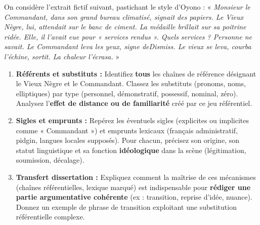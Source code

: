 \documentclass[11pt]{article}
\begin{document}
\begin{exercice}
On considère l'extrait fictif suivant, pastichant le style d'Oyono : 
« \textit{Monsieur le Commandant, dans son grand bureau climatisé, signait des papiers. Le Vieux Nègre, lui, attendait sur le banc de ciment. La médaille brillait sur sa poitrine ridée. Elle, il l'avait eue pour « services rendus ». Quels services ? Personne ne savait. Le Commandant leva les yeux, signe deDismiss. Le vieux se leva, courba l'échine, sortit. La chaleur l'écrasa.} »

\begin{enumerate}
    \item \textbf{Référents et substituts :} Identifiez \textbf{tous} les chaînes de référence désignant le Vieux Nègre et le Commandant. Classez les substituts (pronoms, noms, elliptiques) par type (personnel, démonstratif, possessif, nominal, zéro). Analysez l'\textbf{effet de distance ou de familiarité} créé par ce jeu référentiel.
    \item \textbf{Sigles et emprunts :} Repérez les éventuels sigles (explicites ou implicites comme « Commandant ») et emprunts lexicaux (français administratif, pidgin, langues locales supposés). Pour chacun, précisez son origine, son statut linguistique et sa fonction \textbf{idéologique} dans la scène (légitimation, soumission, décalage).
    \item \textbf{Transfert dissertation :} Expliquez comment la maîtrise de ces mécanismes (chaînes référentielles, lexique marqué) est indispensable pour \textbf{rédiger une partie argumentative cohérente} (ex : transition, reprise d'idée, nuance). Donnez un exemple de phrase de transition exploitant une substitution référentielle complexe.
\end{enumerate}
\end{exercice}
\end{document}
